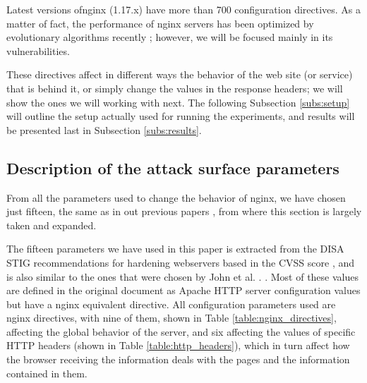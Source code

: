 \documentclass[sigconf]{acmart}
\begin{document}
Latest versions
of{\sf nginx} (1.17.x) have more than 700 configuration
directives. As a matter of fact, the performance of {\sf nginx}
servers has been optimized by  evolutionary algorithms recently
\cite{chi2018hybrid}; however, we will be focused mainly in its
vulnerabilities.


These directives affect in different ways the behavior of
the web site (or service) that is behind it, or simply change the
values in the response headers; we will show the ones we will working
with next. The following Subsection \ref{subs:setup}
will outline the setup actually used for running the experiments, and
results will be presented last in Subsection \ref{subs:results}.

\subsection{Description of the attack surface parameters}

From all the parameters used to change the behavior of {\sf nginx}, we
have chosen just fifteen, the same as in out previous papers
\cite{erseco:evostar:anon,erseco:cec}, from where this section is largely taken
and expanded.

The fifteen parameters we have used in this paper is extracted from the DISA STIG recommendations for
hardening webservers based in the CVSS score
\cite{disa20:apache}, and is also similar to the ones that were chosen
by John et al. \cite{john_evolutionary_2014}.
. Most of these values are defined in the original
document as Apache HTTP server configuration values but have a {\sf
nginx} equivalent directive. All configuration parameters used are
{\sf nginx} directives, with nine of them, shown in Table
\ref{table:nginx_directives}, affecting the global behavior of the
server, and six affecting the values of specific HTTP headers (shown
in Table \ref{table:http_headers}), which in turn affect how the
browser receiving the information deals with the pages and the
information contained in them.
\end{document}
